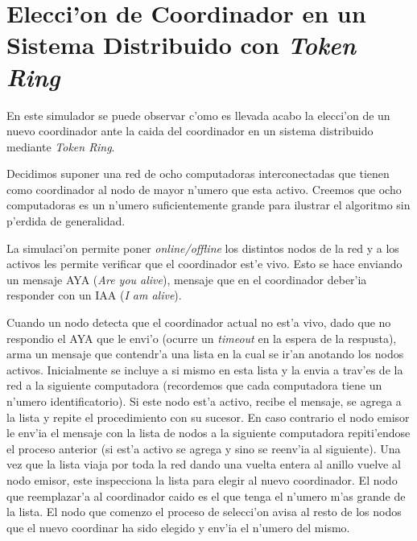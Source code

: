 \section{Elecci'on de Coordinador en un Sistema Distribuido con \emph{Token Ring}}
En este simulador se puede observar c'omo es llevada acabo la elecci'on de un
nuevo coordinador ante la caida del coordinador en
un sistema distribuido mediante \emph{Token Ring}.

Decidimos suponer una red de ocho computadoras interconectadas que tienen como
coordinador al nodo de mayor n'umero que esta activo. Creemos que ocho
computadoras es un n'umero suficientemente grande para ilustrar el algoritmo sin p'erdida
de generalidad.

La simulaci'on permite poner \emph{online/offline} los distintos nodos de la
red y a los activos les permite verificar que el coordinador est'e vivo. Esto
se hace enviando un mensaje AYA (\emph{Are you alive}), mensaje que en el
coordinador deber'ia responder con un IAA (\emph{I am alive}).

Cuando un nodo detecta que el coordinador actual no est'a vivo, dado que no
respondio el AYA que le envi'o (ocurre un  \emph{timeout} en la espera de la
respusta), arma un mensaje que contendr'a una lista en la cual se ir'an anotando
los nodos activos. Inicialmente se incluye a si mismo en
esta lista y la envia a trav'es de la red a la siguiente computadora
(recordemos que cada computadora tiene un n'umero identificatorio). Si este nodo est'a activo, recibe el mensaje, se agrega a la lista
y repite el procedimiento con su sucesor. En caso contrario el nodo emisor le 
env'ia el mensaje con la lista de nodos a la siguiente computadora repiti'endose
el proceso anterior (si est'a activo se agrega y sino se reenv'ia al siguiente). Una vez
que la lista viaja por toda la red dando una vuelta entera al anillo vuelve al
nodo emisor, este inspecciona la lista para elegir al nuevo coordinador. El
nodo que reemplazar'a al coordinador caido es el que tenga el n'umero m'as
grande de la lista. El nodo que comenzo el proceso de selecci'on avisa al resto
de los nodos que el nuevo coordinar ha sido elegido y env'ia el n'umero del
mismo.


